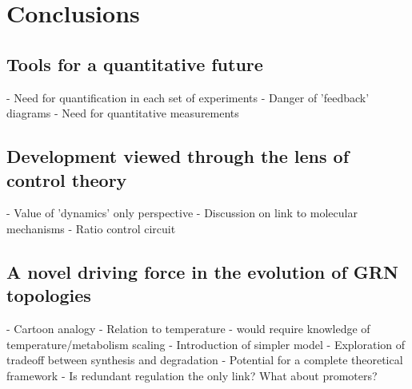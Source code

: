 \chapter{Conclusions}
\label{ch:conclusion}


\section{ Tools for a quantitative future }

- Need for quantification in each set of experiments
- Danger of 'feedback' diagrams
- Need for quantitative measurements


\section{ Development viewed through the lens of control theory }

- Value of 'dynamics' only perspective
- Discussion on link to molecular mechanisms
- Ratio control circuit


\section{ A novel driving force in the evolution of GRN topologies }

- Cartoon analogy
- Relation to temperature - would require knowledge of temperature/metabolism scaling
- Introduction of simpler model
- Exploration of tradeoff between synthesis and degradation
- Potential for a complete theoretical framework
- Is redundant regulation the only link? What about promoters?








